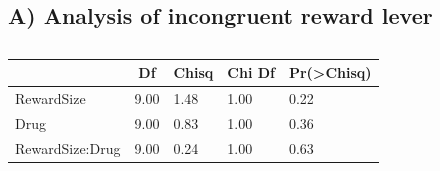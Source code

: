 \documentclass[
]{article}
\begin{document}
\hypertarget{a-analysis-of-incongruent-reward-lever}{%
\subsection{A) Analysis of incongruent reward
lever}\label{a-analysis-of-incongruent-reward-lever}}

\begin{table}[tbp]

\begin{center}
\begin{threeparttable}

\caption{\label{tab:Analysis 2: Probability of both levers }}

\begin{tabular}{lllll}
\toprule
 & \multicolumn{1}{c}{Df} & \multicolumn{1}{c}{Chisq} & \multicolumn{1}{c}{Chi Df} & \multicolumn{1}{c}{Pr(>Chisq)}\\
\midrule
RewardSize & 9.00 & 1.48 & 1.00 & 0.22\\
Drug & 9.00 & 0.83 & 1.00 & 0.36\\
RewardSize:Drug & 9.00 & 0.24 & 1.00 & 0.63\\
\bottomrule
\end{tabular}

\end{threeparttable}
\end{center}

\end{table}
\end{document}
